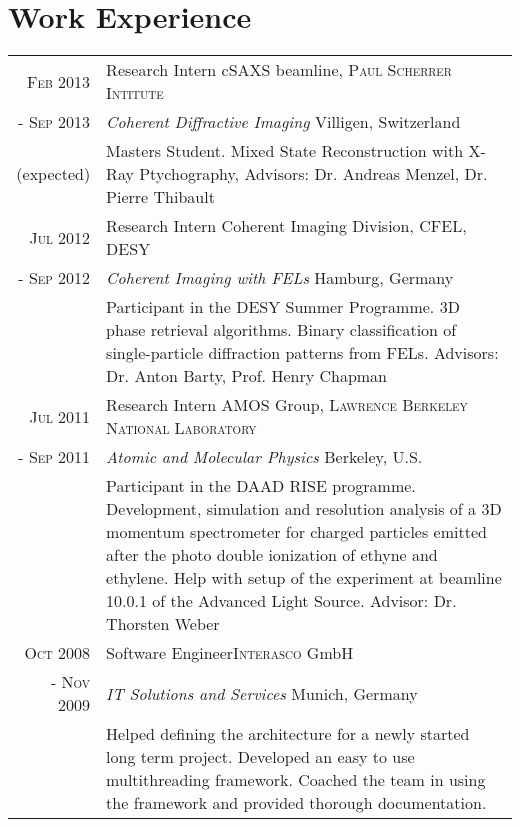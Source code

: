 \documentclass[a4paper,10pt]{article}
\begin{document}
\section{Work Experience}
\begin{tabularx}{19cm}{rX}

 \textsc{Feb 2013} & Research Intern \hfill cSAXS beamline, \textsc{Paul Scherrer Intitute}\\
\textsc{- Sep 2013} &\emph{Coherent Diffractive Imaging} \hfill Villigen, Switzerland\\
\small{(expected)}&\footnotesize{Masters Student. Mixed State Reconstruction with X-Ray Ptychography, Advisors: Dr. Andreas Menzel, Dr. Pierre Thibault}\vspace{2mm}\\ 

 \textsc{Jul 2012} & Research Intern \hfill Coherent Imaging Division, \textsc{CFEL, DESY}\\
\textsc{- Sep 2012} &\emph{Coherent Imaging with FELs} \hfill Hamburg, Germany\\
&\footnotesize{Participant in the DESY Summer Programme. 3D phase retrieval algorithms. Binary classification of single-particle diffraction patterns from FELs. Advisors: Dr. Anton Barty, Prof. Henry Chapman}\vspace{2mm}\\ 

 \textsc{Jul 2011} & Research Intern \hfill AMOS Group, \textsc{Lawrence Berkeley National Laboratory}\\
\textsc{- Sep 2011} &\emph{Atomic and Molecular Physics} \hfill Berkeley, U.S.\\
&\footnotesize{Participant in the DAAD RISE programme. Development, simulation and resolution analysis of a 3D momentum spectrometer for charged particles emitted
after the photo double ionization of ethyne and ethylene. Help with setup of the experiment at beamline 10.0.1 of
the Advanced Light Source. Advisor: Dr. Thorsten Weber}\vspace{2mm}\\ 

 \textsc{Oct 2008} & Software Engineer\hfill \textsc{Interasco} GmbH
 \\\textsc{- Nov 2009}&\emph{IT Solutions and Services} \hfill Munich, Germany\\&\footnotesize{Helped defining the architecture for a newly started long term project. Developed an easy to use multithreading framework. Coached the team in using the framework and provided thorough documentation.}\vspace{2mm}\\ 


\end{tabularx}
\end{document}
